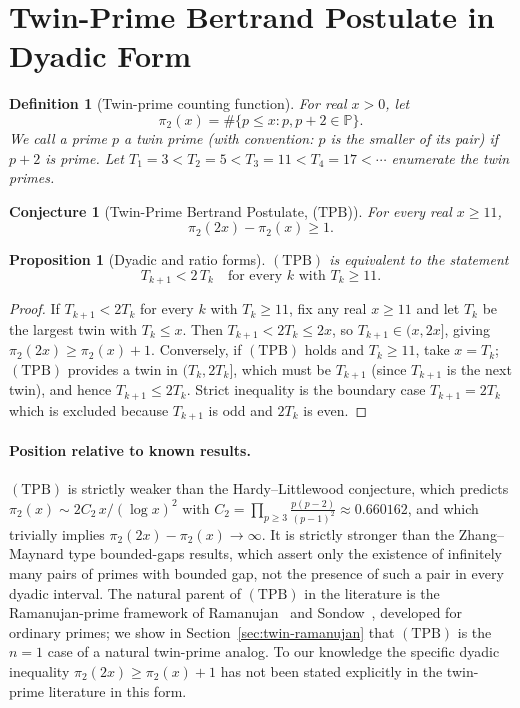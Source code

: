 \documentclass[11pt]{article}
\newtheorem{proposition}[theorem]{Proposition}
\newtheorem{conjecture}[theorem]{Conjecture}
\newtheorem{definition}[theorem]{Definition}
\begin{document}
\section{Twin-Prime Bertrand Postulate in Dyadic Form}\label{sec:tpb}

\begin{definition}[Twin-prime counting function]
For real $x>0$, let
\[
\pi_2(x)=\#\{p\le x\colon p,p+2\in\mathbb{P}\}.
\]
We call a prime $p$ a \emph{twin prime} (with convention: $p$ is the
\emph{smaller} of its pair) if $p+2$ is prime. Let
$T_1=3<T_2=5<T_3=11<T_4=17<\cdots$ enumerate the twin primes.
\end{definition}

\begin{conjecture}[Twin-Prime Bertrand Postulate, ($\mathrm{TPB}$)]
\label{conj:TPB}
For every real $x\ge 11$,
\[
\pi_2(2x)-\pi_2(x)\ge 1.
\]
\end{conjecture}

\begin{proposition}[Dyadic and ratio forms]\label{prop:dyadic-ratio}
$(\mathrm{TPB})$ is equivalent to the statement
\[
T_{k+1}<2\,T_k\quad\text{for every }k\text{ with }T_k\ge 11.
\]
\end{proposition}

\begin{proof}
If $T_{k+1}<2T_k$ for every $k$ with $T_k\ge 11$, fix any real $x\ge 11$
and let $T_k$ be the largest twin with $T_k\le x$. Then $T_{k+1}<2T_k
\le 2x$, so $T_{k+1}\in(x,2x]$, giving $\pi_2(2x)\ge\pi_2(x)+1$.
Conversely, if $(\mathrm{TPB})$ holds and $T_k\ge 11$, take $x=T_k$;
$(\mathrm{TPB})$ provides a twin in $(T_k,2T_k]$, which must be
$T_{k+1}$ (since $T_{k+1}$ is the next twin), and hence $T_{k+1}\le
2T_k$. Strict inequality is the boundary case $T_{k+1}=2T_k$ which is
excluded because $T_{k+1}$ is odd and $2T_k$ is even.
\end{proof}

\paragraph{Position relative to known results.}
$(\mathrm{TPB})$ is strictly weaker than the Hardy--Littlewood
conjecture, which predicts
$\pi_2(x)\sim 2C_2\,x/(\log x)^2$ with $C_2=\prod_{p\ge 3}
\frac{p(p-2)}{(p-1)^2}\approx 0.660162$, and which trivially implies
$\pi_2(2x)-\pi_2(x)\to\infty$. It is strictly stronger than the
Zhang--Maynard type bounded-gaps results, which assert only the
existence of infinitely many pairs of primes with bounded gap, not
the presence of such a pair in every dyadic interval. The natural
parent of $(\mathrm{TPB})$ in the literature is the Ramanujan-prime
framework of Ramanujan~\cite{Ramanujan1919} and
Sondow~\cite{Sondow2009}, developed for ordinary primes; we show in
Section~\ref{sec:twin-ramanujan} that $(\mathrm{TPB})$ is the $n=1$
case of a natural twin-prime analog. To our knowledge the specific
dyadic inequality $\pi_2(2x)\ge\pi_2(x)+1$ has not been stated
explicitly in the twin-prime literature in this form.
\end{document}

